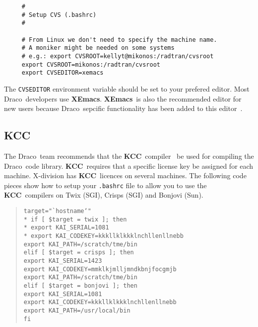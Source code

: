 \documentclass[11pt]{nmemo}
\newcommand{\comp}[1]{\normalfont\normalsize\texttt{#1}}
\newcommand{\draco}{{\normalfont\sffamily Draco}}
\newcommand{\kcc}{{\normalfont\bfseries KCC}}
\newcommand{\xemacs}{{\normalfont\bfseries XEmacs}}
\begin{document}
\begin{verbatim}
     #
     # Setup CVS (.bashrc)
     #

     # From Linux we don't need to specify the machine name.
     # A moniker might be needed on some systems
     # e.g.: export CVSROOT=kellyt@mikonos:/radtran/cvsroot
     export CVSROOT=mikonos:/radtran/cvsroot
     export CVSEDITOR=xemacs
\end{verbatim}

The \comp{CVSEDITOR} environment variable should be set to your
prefered editor.  Most \draco\ developers use \xemacs.   \xemacs\ is
also the recommended editor for new users because \draco\ sepcific
functionality has been added to this editor~\cite{xtm:9909}.

\subsection{KCC}

The \draco\ team recommends that the \kcc\ compiler~\cite{kai} be used
for compiling the \draco\ code library.  \kcc\ requires that a
specific license key be assigned for each machine.  X-division has
\kcc\ licences on several machines.  The following code pieces show
how to setup your \comp{.bashrc} file to allow you to use the \kcc\ 
compilers on Twix (SGI), Crisps (SGI) and Bonjovi (Sun).

\begin{verse}
\texttt{target="`hostname`"\\*
     if [ \$target = twix ]; then\\*
\hspace*{0.25in}         export KAI\_SERIAL=1081\\*
\hspace*{0.25in}         export KAI\_CODEKEY=kkkllklkkklnchllenllnebb\\
\hspace*{0.25in}         export KAI\_PATH=/scratch/tme/bin\\
    elif [ \$target = crisps ]; then\\
\hspace*{0.25in}         export KAI\_SERIAL=1423\\
\hspace*{0.25in}         export KAI\_CODEKEY=mmklkjmlljmndkbnjfocgmjb\\
\hspace*{0.25in}         export KAI\_PATH=/scratch/tme/bin\\
    elif [ \$target = bonjovi ]; then\\
\hspace*{0.25in}         export KAI\_SERIAL=1081\\
\hspace*{0.25in}         export KAI\_CODEKEY=kkkllklkkklnchllenllnebb\\
\hspace*{0.25in}         export KAI\_PATH=/usr/local/bin\\
    fi
}
\end{verse}
\end{document}
